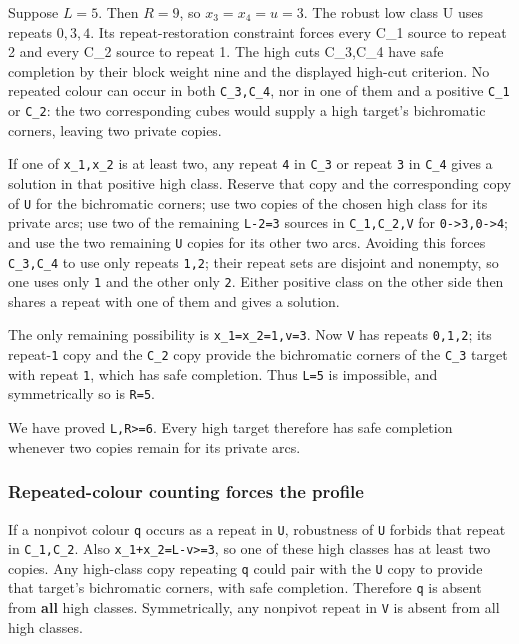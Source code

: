 \documentclass[
  10pt,
]{article}
\begin{document}
Suppose \(L=5\). Then \(R=9\), so \(x_3=x_4=u=3\). The robust low class
U uses repeats \(0,3,4\). Its repeat-restoration constraint forces every
C\_1 source to repeat 2 and every C\_2 source to repeat 1. The high cuts
C\_3,C\_4 have safe completion by their block weight nine and the
displayed high-cut criterion. No repeated colour can occur in both
\texttt{C\_3,C\_4}, nor in one of them and a positive \texttt{C\_1} or
\texttt{C\_2}: the two corresponding cubes would supply a high target's
bichromatic corners, leaving two private copies.

If one of \texttt{x\_1,x\_2} is at least two, any repeat \texttt{4} in
\texttt{C\_3} or repeat \texttt{3} in \texttt{C\_4} gives a solution in
that positive high class. Reserve that copy and the corresponding copy
of \texttt{U} for the bichromatic corners; use two copies of the chosen
high class for its private arcs; use two of the remaining \texttt{L-2=3}
sources in \texttt{C\_1,C\_2,V} for
\texttt{0-\textgreater{}3,0-\textgreater{}4}; and use the two remaining
\texttt{U} copies for its other two arcs. Avoiding this forces
\texttt{C\_3,C\_4} to use only repeats \texttt{1,2}; their repeat sets
are disjoint and nonempty, so one uses only \texttt{1} and the other
only \texttt{2}. Either positive class on the other side then shares a
repeat with one of them and gives a solution.

The only remaining possibility is \texttt{x\_1=x\_2=1,v=3}. Now
\texttt{V} has repeats \texttt{0,1,2}; its repeat-\texttt{1} copy and
the \texttt{C\_2} copy provide the bichromatic corners of the
\texttt{C\_3} target with repeat \texttt{1}, which has safe completion.
Thus \texttt{L=5} is impossible, and symmetrically so is \texttt{R=5}.

We have proved \texttt{L,R\textgreater{}=6}. Every high target therefore
has safe completion whenever two copies remain for its private arcs.

\hypertarget{repeated-colour-counting-forces-the-profile}{%
\subsubsection*{Repeated-colour counting forces the
profile}\label{repeated-colour-counting-forces-the-profile}}

If a nonpivot colour \texttt{q} occurs as a repeat in \texttt{U},
robustness of \texttt{U} forbids that repeat in \texttt{C\_1,C\_2}. Also
\texttt{x\_1+x\_2=L-v\textgreater{}=3}, so one of these high classes has
at least two copies. Any high-class copy repeating \texttt{q} could pair
with the \texttt{U} copy to provide that target's bichromatic corners,
with safe completion. Therefore \texttt{q} is absent from \textbf{all}
high classes. Symmetrically, any nonpivot repeat in \texttt{V} is absent
from all high classes.
\end{document}
